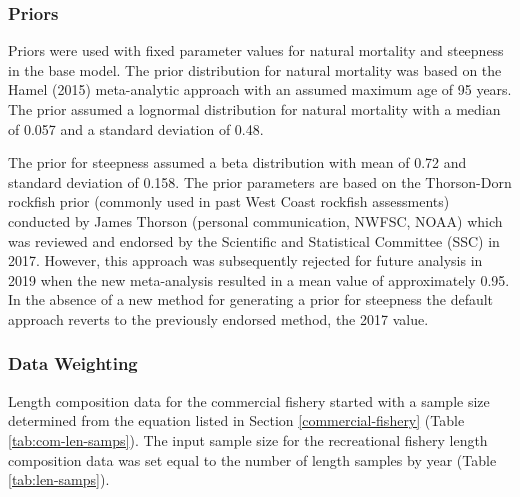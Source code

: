 \documentclass[11pt,
  english,
  a4paper,
]{article}
\begin{document}
\hypertarget{priors}{%
\subsubsection{Priors}\label{priors}}

\leavevmode\tagmcend\tagstructend


Priors were used with fixed parameter values for natural mortality and steepness in the base model. The prior distribution for natural mortality was based on the Hamel {(2015)\leavevmode\tagmcend\tagstructend} meta-analytic approach with an assumed maximum age of 95 years. The prior assumed a lognormal distribution for natural mortality with a median of 0.057 and a standard deviation of 0.48.

\leavevmode\tagmcend\tagstructend\par


The prior for steepness assumed a beta distribution with mean of 0.72 and standard deviation of 0.158. The prior parameters are based on the Thorson-Dorn rockfish prior (commonly used in past West Coast rockfish assessments) conducted by James Thorson (personal communication, NWFSC, NOAA) which was reviewed and endorsed by the Scientific and Statistical Committee (SSC) in 2017. However, this approach was subsequently rejected for future analysis in 2019 when the new meta-analysis resulted in a mean value of approximately 0.95. In the absence of a new method for generating a prior for steepness the default approach reverts to the previously endorsed method, the 2017 value.

\leavevmode\tagmcend\tagstructend\par


\hypertarget{data-weighting}{%
\subsubsection{Data Weighting}\label{data-weighting}}

\leavevmode\tagmcend\tagstructend


Length composition data for the commercial fishery started with a sample size determined from the equation listed in Section \ref{commercial-fishery} (Table \ref{tab:com-len-samps}). The input sample size for the recreational fishery length composition data was set equal to the number of length samples by year (Table \ref{tab:len-samps}).
\end{document}
